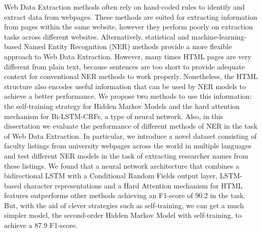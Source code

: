 Web Data Extraction methods often rely on hand-coded rules to 
identify and extract data from webpages. These methods are
suited for extracting information from pages within
the same website, however they perform poorly on extraction 
tasks across different websites. Alternatively, statistical and 
machine-learning-based Named Entity Recognition (NER) methods provide a more flexible 
approach to Web Data Extraction. However, many times HTML pages are very different 
from plain text, because sentences are too short to provide adequate 
context for conventional NER methods to work 
properly. Nonetheless, the HTML structure also encodes useful information that 
can be used by NER models to achieve a better performance. We propose two
methods to use this information: the self-training strategy for Hidden Markov
Models and the hard attention mechanism for Bi-LSTM-CRFs, a type of neural network.
Also, in this dissertation we 
evaluate the performance of different methods of NER
in the task of Web Data Extraction. In particular, we introduce a novel 
dataset consisting of faculty listings from university webpages across
the world in multiple languages and test different NER models in the task of 
extracting researcher names from these listings. We found that a 
neural network architecture that combines a bidirectional LSTM with
a Conditional Random Fields output layer, LSTM-based character 
representations and a Hard Attention mechanism for HTML features
outperforms other methods achieving an F1-score of 90.2 in the task.
But, with the aid of clever strategies such as self-training, we can get a 
much simpler model, the second-order Hidden Markov Model with self-training, 
to achieve a 87.9 F1-score.



